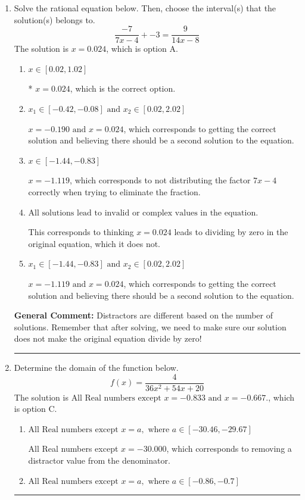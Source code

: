 \documentclass{extbook}[14pt]
\newcommand{\litem}[1]{\item #1

\rule{\textwidth}{0.4pt}}
\begin{document}
\begin{enumerate}\litem{
Solve the rational equation below. Then, choose the interval(s) that the solution(s) belongs to.
\[ \frac{-7}{7x -4} + -3 = \frac{9}{14x -8} \]The solution is \( x = 0.024 \), which is option A.\begin{enumerate}[label=\Alph*.]
\item \( x \in [0.02,1.02] \)

* $x = 0.024$, which is the correct option.
\item \( x_1 \in [-0.42, -0.08] \text{ and } x_2 \in [0.02,2.02] \)

$x = -0.190 \text{ and } x = 0.024$, which corresponds to getting the correct solution and believing there should be a second solution to the equation.
\item \( x \in [-1.44,-0.83] \)

$x = -1.119$, which corresponds to not distributing the factor $7x -4$ correctly when trying to eliminate the fraction.
\item \( \text{All solutions lead to invalid or complex values in the equation.} \)

This corresponds to thinking $x = 0.024$ leads to dividing by zero in the original equation, which it does not.
\item \( x_1 \in [-1.44, -0.83] \text{ and } x_2 \in [0.02,2.02] \)

$x = -1.119 \text{ and } x = 0.024$, which corresponds to getting the correct solution and believing there should be a second solution to the equation.
\end{enumerate}

\textbf{General Comment:} Distractors are different based on the number of solutions. Remember that after solving, we need to make sure our solution does not make the original equation divide by zero!
}
\litem{
Determine the domain of the function below.
\[ f(x) = \frac{4}{36x^{2} +54 x + 20} \]The solution is \( \text{All Real numbers except } x = -0.833 \text{ and } x = -0.667. \), which is option C.\begin{enumerate}[label=\Alph*.]
\item \( \text{All Real numbers except } x = a, \text{ where } a \in [-30.46, -29.67] \)

All Real numbers except $x = -30.000$, which corresponds to removing a distractor value from the denominator.
\item \( \text{All Real numbers except } x = a, \text{ where } a \in [-0.86, -0.7] \)


\end{enumerate}}
\end{enumerate}
\end{document}
